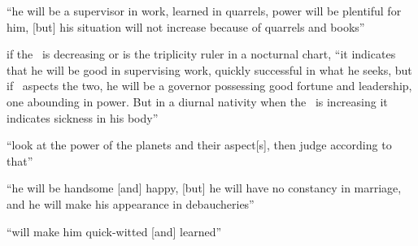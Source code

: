 \begin{description}[style=multiline,leftmargin=2.5cm]
\item[\Mars\Trine\Mercury] ``he will be a supervisor in work, learned in quarrels, power will be plentiful for him, [but] his situation will not increase because of quarrels and books''

\item[\Mars\Trine\Moon] if the \Moon\, is decreasing or is the triplicity ruler in a nocturnal chart, ``it indicates that he will be good in supervising work, quickly successful in what he seeks, but if \Jupiter\, aspects the two, he will be a governor possessing good fortune and leadership, one abounding in power. But in a diurnal nativity when the \Moon\, is increasing it indicates sickness in his body''

\item[\Sun\Trine\Moon] ``look at the power of the planets and their aspect[s], then judge according to that''

\item[\Venus\Trine\Moon] ``he will be handsome [and] happy, [but] he will have no constancy in marriage, and he will make his appearance in debaucheries''

\item[\Mercury\Trine\Moon] ``will make him quick-witted [and] learned''
\end{description}